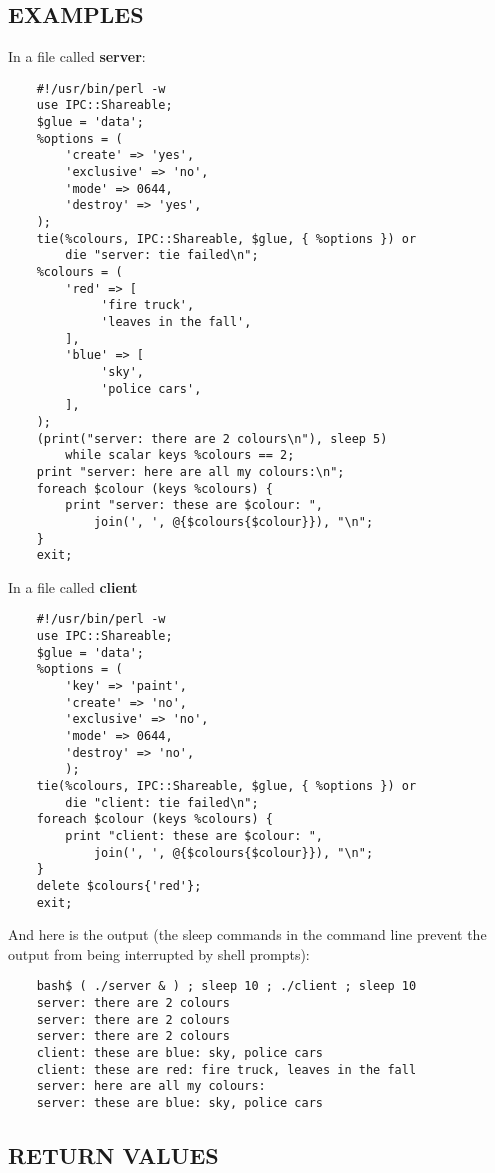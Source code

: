 \subsection*{EXAMPLES}
In a file called {\bf server}:
\begin{verbatim}
    #!/usr/bin/perl -w
    use IPC::Shareable;
    $glue = 'data';
    %options = (
        'create' => 'yes',
        'exclusive' => 'no',
        'mode' => 0644,
        'destroy' => 'yes',
    );
    tie(%colours, IPC::Shareable, $glue, { %options }) or
        die "server: tie failed\n";
    %colours = (
        'red' => [
             'fire truck',
             'leaves in the fall',
        ],
        'blue' => [
             'sky',
             'police cars',
        ],
    );
    (print("server: there are 2 colours\n"), sleep 5)
        while scalar keys %colours == 2;
    print "server: here are all my colours:\n";
    foreach $colour (keys %colours) {
        print "server: these are $colour: ",
            join(', ', @{$colours{$colour}}), "\n";
    }
    exit;
\end{verbatim}

In a file called {\bf client}
\begin{verbatim}
    #!/usr/bin/perl -w
    use IPC::Shareable;
    $glue = 'data';
    %options = (
        'key' => 'paint',
        'create' => 'no',
        'exclusive' => 'no',
        'mode' => 0644,
        'destroy' => 'no',
        );
    tie(%colours, IPC::Shareable, $glue, { %options }) or
        die "client: tie failed\n";
    foreach $colour (keys %colours) {
        print "client: these are $colour: ",
            join(', ', @{$colours{$colour}}), "\n";
    }
    delete $colours{'red'};
    exit;
\end{verbatim}

And here is the output (the sleep commands in the command line prevent
the output from being interrupted by shell prompts):
\begin{verbatim}
    bash$ ( ./server & ) ; sleep 10 ; ./client ; sleep 10
    server: there are 2 colours
    server: there are 2 colours
    server: there are 2 colours
    client: these are blue: sky, police cars
    client: these are red: fire truck, leaves in the fall
    server: here are all my colours:
    server: these are blue: sky, police cars
\end{verbatim}

\subsection*{RETURN VALUES}%

